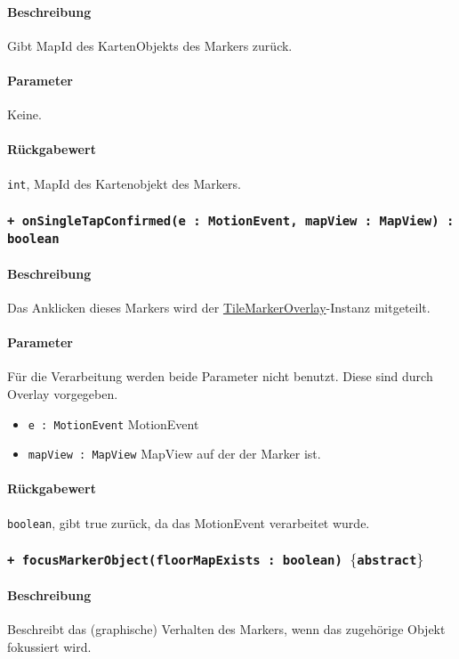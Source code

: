 \paragraph*{Beschreibung}
Gibt MapId des KartenObjekts des Markers zurück.
\paragraph*{Parameter}
Keine.
\paragraph*{Rückgabewert}
\texttt{int}, MapId des Kartenobjekt des Markers.

\subsubsection*{\texttt{+ onSingleTapConfirmed(e : MotionEvent, mapView : MapView) : boolean}}%
\paragraph*{Beschreibung}
Das Anklicken dieses Markers wird der \hyperref[App_Map_View_TileMarkerOverlay]{TileMarkerOverlay}-Instanz mitgeteilt.
\paragraph*{Parameter}
Für die Verarbeitung werden beide Parameter nicht benutzt. Diese sind durch Overlay vorgegeben.
\begin{itemize}
    \item \texttt{e : MotionEvent} MotionEvent
    \item \texttt{mapView : MapView} MapView auf der der Marker ist.
\end{itemize}
\paragraph*{Rückgabewert}
\texttt{boolean}, gibt true zurück, da das MotionEvent verarbeitet wurde.

\subsubsection*{\texttt{+ focusMarkerObject(floorMapExists : boolean) $\lbrace$abstract$\rbrace$}}%
\paragraph*{Beschreibung}
Beschreibt das (graphische) Verhalten des Markers, wenn das zugehörige Objekt fokussiert wird.

